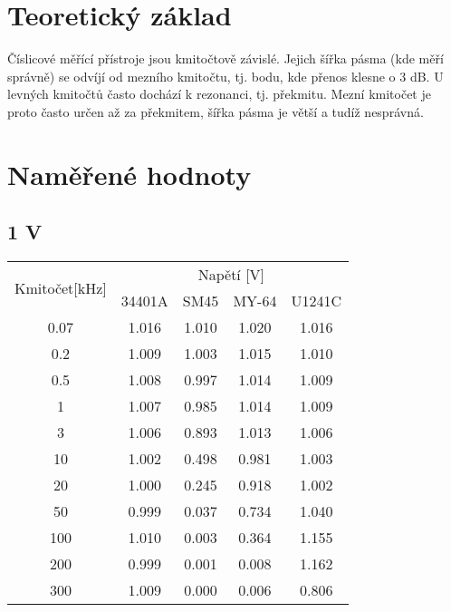 \documentclass{article}
\begin{document}
\section{Teoretický základ}
Číslicové měřící přístroje jsou kmitočtově závislé. Jejich šířka pásma (kde měří správně) se odvíjí od mezního kmitočtu, tj. bodu, kde přenos klesne o 3 dB. U levných kmitočtů často dochází k rezonanci, tj. překmitu. Mezní kmitočet je proto často určen až za překmitem, šířka pásma je větší a tudíž nesprávná.

\section{Naměřené hodnoty}

\subsection{1 V}
\begin{tabular}{c || c | c | c | c}
	\multirow{2}{*}{Kmitočet[\si{\kilo\hertz}]} & \multicolumn{4}{c}{Napětí [\si{\volt}] }\\ & 34401A & SM45 & MY-64 & U1241C \\\hline \hline
	0.07 & 1.016 & 1.010 & 1.020 & 1.016 \\\hline
	0.2 & 1.009 & 1.003 & 1.015 & 1.010 \\\hline
	0.5 & 1.008 & 0.997 & 1.014 & 1.009 \\\hline
	1 & 1.007 & 0.985 & 1.014 & 1.009 \\\hline
	3 & 1.006 & 0.893 & 1.013 & 1.006 \\\hline
	10 & 1.002 & 0.498 & 0.981 & 1.003 \\\hline
	20 & 1.000 & 0.245 & 0.918 & 1.002 \\\hline
	50 & 0.999 & 0.037 & 0.734 & 1.040 \\\hline
	100 & 1.010 & 0.003 & 0.364 & 1.155 \\\hline
	200 & 0.999 & 0.001 & 0.008 & 1.162 \\\hline
	300 & 1.009 & 0.000 & 0.006 & 0.806
\end{tabular}
\end{document}
